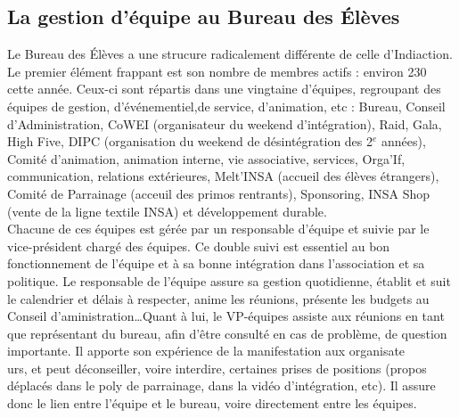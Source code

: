 \subsection{La gestion d'équipe au Bureau des Élèves}
Le Bureau des Élèves a une strucure radicalement différente de celle d'Indiaction. Le premier élément frappant est son nombre de membres actifs : environ 230 cette année. Ceux-ci sont répartis dans une vingtaine d'équipes, regroupant des équipes de gestion, d'événementiel,de service, d'animation, etc : Bureau, Conseil d'Administration, CoWEI (organisateur du weekend d'intégration), Raid, Gala, High Five, DIPC (organisation du weekend de \og désintégration \fg{} des 2$^e$ années), Comité d'animation, animation interne, vie associative, services, Orga'If, communication, relations extérieures, Melt'INSA (accueil des élèves étrangers), Comité de Parrainage (acceuil des primos rentrants), Sponsoring, INSA Shop (vente de la ligne textile INSA) et développement durable. %
\\

Chacune de ces équipes est gérée par un responsable d'équipe et suivie par le vice-président chargé des équipes.
Ce double suivi est essentiel au bon fonctionnement de l'équipe et à sa bonne intégration dans l'association et sa politique. Le responsable de l'équipe assure sa gestion quotidienne, établit et suit le calendrier et délais à respecter, anime les réunions, présente les budgets au Conseil d'aministration\ldots Quant à lui, le VP-équipes assiste aux réunions en tant que représentant du bureau, afin d'être consulté en cas de problème, de question importante. Il apporte son expérience de la manifestation aux organisate\\
urs, et peut déconseiller, voire interdire, certaines prises de positions (propos déplacés dans le poly de parrainage, dans la vidéo d'intégration, etc). Il assure donc le lien entre l'équipe et le bureau, voire directement entre les équipes.\\

